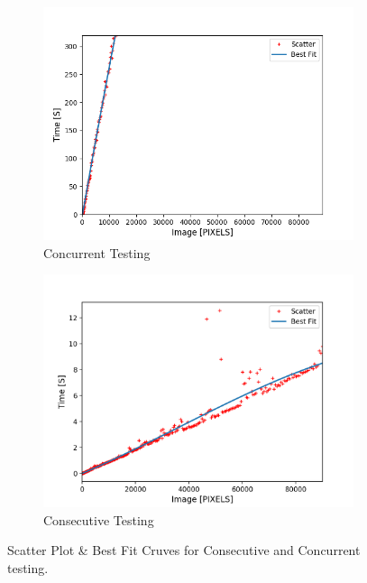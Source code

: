 \documentclass{article}
\begin{document}
\begin{figure}[ht]
\centering
\begin{subfigure}{.5\textwidth}
  \centering
  \includegraphics[width=\linewidth]{tests/concurent.png}
  \caption{Concurrent Testing}
  \label{fig:sub1}
\end{subfigure}%
\begin{subfigure}{.5\textwidth}
  \centering
  \includegraphics[width=\linewidth]{tests/consecutive.png}
  \caption{Consecutive Testing}
  \label{fig:sub2}
\end{subfigure}
\caption{Scatter Plot  \& Best Fit Cruves for Consecutive and Concurrent testing. }
\label{fig:concurrency_test}
\end{figure}
\end{document}
